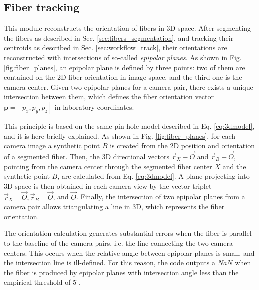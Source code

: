 \documentclass[10pt,a4paper]{article}
\begin{document}
\subsection{Fiber tracking} \label{sec:fiber_tracking}

This module reconstructs the orientation of fibers in 3D space. After segmenting the fibers as described in Sec. \ref{sec:fibers_segmentation}, and tracking their centroids as described in Sec. \ref{sec:workflow_track}, their orientations are reconstructed with intersections of so-called \textit{epipolar planes}. As shown in Fig. \ref{fig:fiber_planes}, an epipolar plane is defined by three points: two of them are contained on the 2D fiber orientation in image space, and the third one is the camera center. Given two epipolar planes for a camera pair, there exists a unique intersection between them, which defines the fiber orientation vector $\textbf{p} = [p_x, p_y, p_z]$ in laboratory coordinates. 

This principle is based on the same pin-hole model described in Eq. \eqref{eq:3dmodel}, and it is here briefly explained. As shown in Fig. \ref{fig:fiber_planes}, for each camera image a synthetic point $B$ is created from the 2D position and orientation of a segmented fiber. Then, the 3D directional vectors $\vec{r}_X - \vec{O}$ and $\vec{r}_B - \vec{O}$, pointing from the camera center through the segmented fiber center $X$ and the synthetic point $B$, are calculated from Eq. \eqref{eq:3dmodel}. A plane projecting into 3D space is then obtained in each camera view by the vector triplet $\vec{r}_X - \vec{O}, \vec{r}_B - \vec{O}$, and $\vec{O}$. Finally, the intersection of two epipolar planes from a camera pair allows triangulating a line in 3D, which represents the fiber orientation.

The orientation calculation generates substantial errors when the fiber is parallel to the baseline of the camera pairs, i.e. the line connecting the two camera centers. This occurs when the relative angle between epipolar planes is small, and the intersection line is ill-defined. For this reason, the code outputs a $NaN$ when the fiber is produced by epipolar planes with intersection angle less than the empirical threshold of $ 5^{\circ}$.
\end{document}

